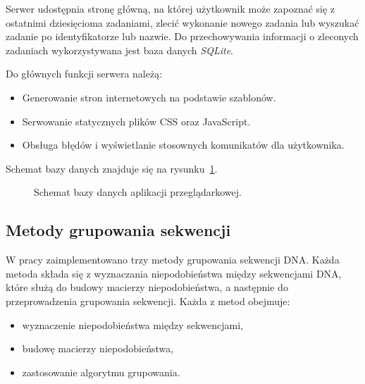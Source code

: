             Serwer udostępnia stronę główną, na której użytkownik może zapoznać się z ostatnimi dziesięcioma zadaniami, zlecić wykonanie nowego zadania lub wyszukać zadanie po identyfikatorze lub nazwie. Do przechowywania informacji o zleconych zadaniach wykorzystywana jest baza danych \textit{SQLite}.
            
            Do głównych funkcji serwera należą:
            \begin{itemize}
                \item Generowanie stron internetowych na podstawie szablonów.
                \item Serwowanie statycznych plików CSS oraz JavaScript.
                \item Obsługa błędów i wyświetlanie stosownych komunikatów dla użytkownika.
            \end{itemize}
            
            Schemat bazy danych znajduje się na rysunku~\ref{Picture:App:Database}.

            \begin{figure}
                \begin{center}
                    
                \end{center}
                \caption{
                    Schemat bazy danych aplikacji przeglądarkowej.
                }\label{Picture:App:Database}
            \end{figure}

    \subsection{Metody grupowania sekwencji}

        W pracy zaimplementowano trzy metody grupowania sekwencji DNA. Każda metoda składa się z wyznaczania niepodobieństwa między sekwencjami DNA, które służą do budowy macierzy niepodobieństwa, a następnie do przeprowadzenia grupowania sekwencji. Każda z metod obejmuje:

        \begin{itemize}
            \item {wyznaczenie niepodobieństwa między sekwencjami,}
            \item {budowę macierzy niepodobieństwa,}
            \item {zastosowanie algorytmu grupowania.}
        \end{itemize}

